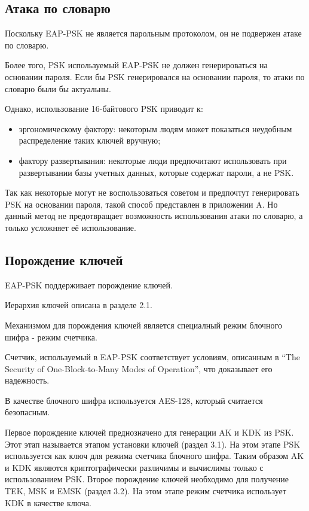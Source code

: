 \subsection{Атака по словарю}

Поскольку EAP-PSK не является парольным протоколом, он не подвержен атаке по словарю.

Более того, PSK используемый EAP-PSK не должен генерироваться на основании пароля. Если бы PSK генерировался на основании пароля, то атаки по словарю были бы актуальны.

Однако, использование 16-байтового PSK приводит к:

\begin{itemize}
\item эргономическому фактору: некоторым людям может показаться неудобным распределение таких ключей вручную;
\item фактору развертывания: некоторые люди предпочитают использовать при развертывании базы учетных данных, которые содержат пароли, а не PSK.
\end{itemize}

Так как некоторые могут не воспользоваться советом и предпочтут генерировать PSK на основании пароля, такой способ представлен в приложении A. Но данный метод не предотвращает возможность использования атаки по словарю, а только усложняет её использование.

\subsection{Порождение ключей}

EAP-PSK поддерживает порождение ключей.

Иерархия ключей описана в разделе 2.1.

Механизмом для порождения ключей является специалный режим блочного шифра - режим счетчика.

Счетчик, используемый в EAP-PSK соответствует условиям, описанным в ``The Security of One-Block-to-Many Modes of Operation'', что доказывает его надежность.

В качестве блочного шифра используется AES-128, который считается безопасным.

Первое порождение ключей преднозначено для генерации AK и KDK из PSK. Этот этап называется этапом установки ключей (раздел 3.1). На этом этапе PSK используется как ключ для режима счетчика блочного шифра. Таким образом AK и KDK являются криптографически различимы и вычислимы только с использованием PSK. Второе порождение ключей необходимо для получение TEK, MSK и EMSK (раздел 3.2). На этом этапе режим счетчика использует KDK в качестве ключа.


